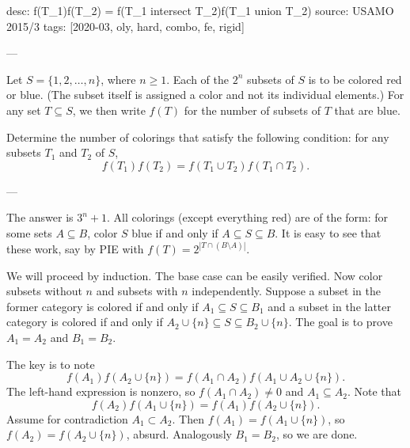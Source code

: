 desc: f(T_1)f(T_2) = f(T_1 intersect T_2)f(T_1 union T_2)
source: USAMO 2015/3
tags: [2020-03, oly, hard, combo, fe, rigid]

---

Let $S=\{1,2,\ldots,n\}$, where $n\ge1$. Each of the $2^n$ subsets of $S$ is to be colored red or blue. (The subset itself is assigned a color and not its individual elements.) For any set $T\subseteq S$, we then write $f(T)$ for the number of subsets of $T$ that are blue.

Determine the number of colorings that satisfy the following condition: for any subsets $T_1$ and $T_2$ of $S$, \[f(T_1)f(T_2)=f(T_1\cup T_2)f(T_1\cap T_2).\]

---

The answer is $3^n+1$. All colorings (except everything red) are of the form: for some sets $A\subseteq B$, color $S$ blue if and only if $A\subseteq S\subseteq B$. It is easy to see that these work, say by PIE with $f(T)=2^{|T\cap(B\setminus A)|}$.

We will proceed by induction. The base case can be easily verified. Now color subsets without $n$ and subsets with $n$ independently. Suppose a subset in the former category is colored if and only if $A_1\subseteq S\subseteq B_1$ and a subset in the latter category is colored if and only if $A_2\cup\{n\}\subseteq S\subseteq B_2\cup\{n\}$. The goal is to prove $A_1=A_2$ and $B_1=B_2$.

The key is to note \[f(A_1)f(A_2\cup\{n\})=f(A_1\cap A_2)f(A_1\cup A_2\cup\{n\}).\]
The left-hand expression is nonzero, so $f(A_1\cap A_2)\ne0$ and $A_1\subseteq A_2$. Note that \[f(A_2)f(A_1\cup\{n\})=f(A_1)f(A_2\cup\{n\}).\]
Assume for contradiction $A_1\subset A_2$. Then $f(A_1)=f(A_1\cup\{n\})$, so $f(A_2)=f(A_2\cup\{n\})$, absurd. Analogously $B_1=B_2$, so we are done.
